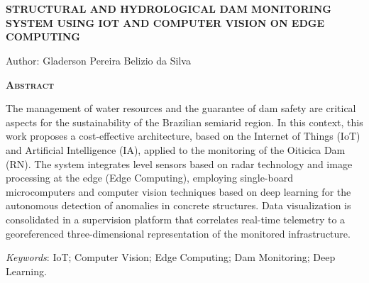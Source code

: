 \chapter*{}
\begin{center}
    {\Large{\textbf{STRUCTURAL AND HYDROLOGICAL DAM MONITORING SYSTEM USING IOT AND COMPUTER VISION ON EDGE COMPUTING}}}
\end{center}

\vspace{1cm}

\begin{flushright}
    Author: Gladerson Pereira Belizio da Silva\\
\end{flushright}

\vspace{1cm}

\begin{center}
    \Large{\textsc{\textbf{Abstract}}}
\end{center}

\noindent 
The management of water resources and the guarantee of dam safety are critical aspects for the sustainability of the Brazilian semiarid region. In this context, this work proposes a cost-effective architecture, based on the Internet of Things (IoT) and Artificial Intelligence (IA), applied to the monitoring of the Oiticica Dam (RN). The system integrates level sensors based on radar technology and image processing at the edge (Edge Computing), employing single-board microcomputers and computer vision techniques based on deep learning for the autonomous detection of anomalies in concrete structures. Data visualization is consolidated in a supervision platform that correlates real-time telemetry to a georeferenced three-dimensional representation of the monitored infrastructure.

\noindent\textit{Keywords}: IoT; Computer Vision; Edge Computing; Dam Monitoring; Deep Learning.
